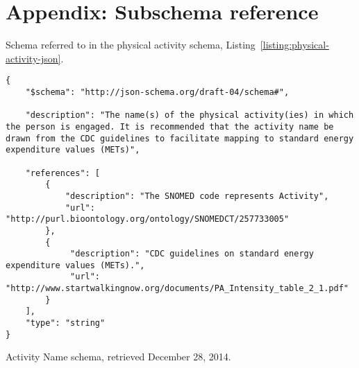\section{Appendix: Subschema reference}

Schema referred to in the physical activity schema, Listing~\ref{listing:physical-activity-json}. 

\begin{listing}
\begin{verbatim}
{
    "$schema": "http://json-schema.org/draft-04/schema#",

    "description": "The name(s) of the physical activity(ies) in which the person is engaged. It is recommended that the activity name be drawn from the CDC guidelines to facilitate mapping to standard energy expenditure values (METs)",

    "references": [
        {
            "description": "The SNOMED code represents Activity",
            "url": "http://purl.bioontology.org/ontology/SNOMEDCT/257733005"
        },
        {
             "description": "CDC guidelines on standard energy expenditure values (METs).",
             "url": "http://www.startwalkingnow.org/documents/PA_Intensity_table_2_1.pdf"
        }
    ],
    "type": "string"
}
\end{verbatim}
\caption{Activity Name schema, retrieved December 28, 2014.} 
\label{listing:activity-name-json}
\end{listing}


